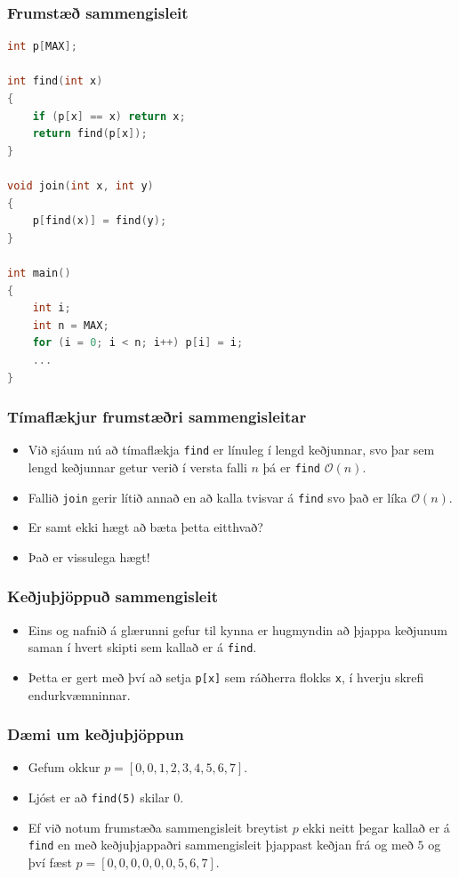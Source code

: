 \documentclass[handout]{beamer}
\begin{document}
\begin{frame}[fragile]
	\frametitle{Frumstæð sammengisleit}
\tiny
\begin{lstlisting}[language=C++]
int p[MAX];

int find(int x)
{
	if (p[x] == x) return x;
	return find(p[x]);
}

void join(int x, int y)
{
	p[find(x)] = find(y);
}

int main()
{
	int i;
	int n = MAX;
	for (i = 0; i < n; i++) p[i] = i;
	...
}
\end{lstlisting}
\end{frame}

\begin{frame}
\frametitle{Tímaflækjur frumstæðri sammengisleitar}
\begin{itemize}
	\item<1-> Við sjáum nú að tímaflækja \texttt{find} er línuleg í lengd keðjunnar, svo 
		þar sem lengd keðjunnar getur verið í versta falli $n$ þá er \texttt{find} $\mathcal{O}(n)$.
	\item<2-> Fallið \texttt{join} gerir lítið annað en að kalla tvisvar á \texttt{find} svo það er líka
		$\mathcal{O}(n)$.
	\item<3-> Er samt ekki hægt að bæta þetta eitthvað?
	\item<4-> Það er vissulega hægt!
\end{itemize}
\end{frame}

\begin{frame}
\frametitle{Keðjuþjöppuð sammengisleit}
\begin{itemize}
	\item<1-> Eins og nafnið á glærunni gefur til kynna er hugmyndin að þjappa keðjunum saman í hvert skipti sem kallað er á
		\texttt{find}.
	\item<2-> Þetta er gert með því að setja \texttt{p[x]} sem ráðherra flokks \texttt{x}, í hverju skrefi endurkvæmninnar.
\end{itemize}
\end{frame}

\begin{frame}
\frametitle{Dæmi um keðjuþjöppun}
\begin{itemize}
	\item<1-> Gefum okkur
		$p = [0, 0, 1, 2, 3, 4, 5, 6, 7]$.
	\item<2-> Ljóst er að \texttt{find(5)} skilar $0$.
	\item<3-> Ef við notum frumstæða sammengisleit breytist $p$ ekki neitt þegar kallað er á \texttt{find}
		en með keðjuþjappaðri sammengisleit þjappast keðjan frá og með $5$ og því fæst
		$p = [0, 0, 0, 0, 0, 0, 5, 6, 7]$.
\end{itemize}
\end{frame}
\end{document}

